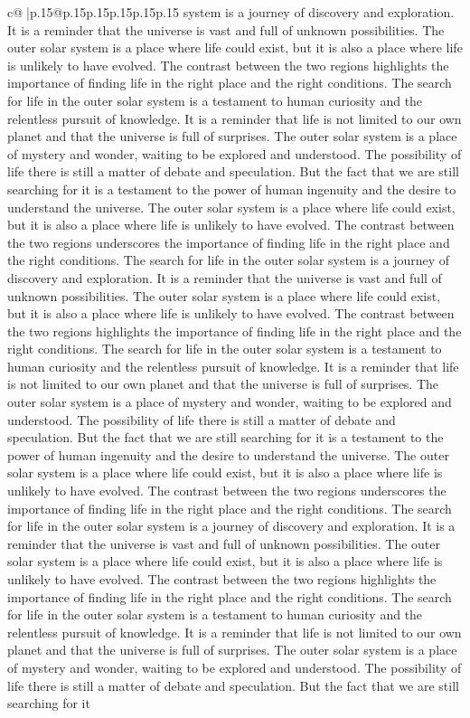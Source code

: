 \documentclass{article}
\begin{document}
{\begin{supertabular}{c@{$\;$}|p{.15\linewidth}@{}p{.15\linewidth}p{.15\linewidth}p{.15\linewidth}p{.15\linewidth}p{.15\linewidth}}
{{{system is a journey of discovery and exploration. It is a reminder that the universe is vast and full of unknown possibilities. The outer solar system is a place where life could exist, but it is also a place where life is unlikely to have evolved. The contrast between the two regions highlights the importance of finding life in the right place and the right conditions. The search for life in the outer solar system is a testament to human curiosity and the relentless pursuit of knowledge. It is a reminder that life is not limited to our own planet and that the universe is full of surprises. The outer solar system is a place of mystery and wonder, waiting to be explored and understood. The possibility of life there is still a matter of debate and speculation. But the fact that we are still searching for it is a testament to the power of human ingenuity and the desire to understand the universe. The outer solar system is a place where life could exist, but it is also a place where life is unlikely to have evolved. The contrast between the two regions underscores the importance of finding life in the right place and the right conditions. The search for life in the outer solar system is a journey of discovery and exploration. It is a reminder that the universe is vast and full of unknown possibilities. The outer solar system is a place where life could exist, but it is also a place where life is unlikely to have evolved. The contrast between the two regions highlights the importance of finding life in the right place and the right conditions. The search for life in the outer solar system is a testament to human curiosity and the relentless pursuit of knowledge. It is a reminder that life is not limited to our own planet and that the universe is full of surprises. The outer solar system is a place of mystery and wonder, waiting to be explored and understood. The possibility of life there is still a matter of debate and speculation. But the fact that we are still searching for it is a testament to the power of human ingenuity and the desire to understand the universe. The outer solar system is a place where life could exist, but it is also a place where life is unlikely to have evolved. The contrast between the two regions underscores the importance of finding life in the right place and the right conditions. The search for life in the outer solar system is a journey of discovery and exploration. It is a reminder that the universe is vast and full of unknown possibilities. The outer solar system is a place where life could exist, but it is also a place where life is unlikely to have evolved. The contrast between the two regions highlights the importance of finding life in the right place and the right conditions. The search for life in the outer solar system is a testament to human curiosity and the relentless pursuit of knowledge. It is a reminder that life is not limited to our own planet and that the universe is full of surprises. The outer solar system is a place of mystery and wonder, waiting to be explored and understood. The possibility of life there is still a matter of debate and speculation. But the fact that we are still searching for it }}}
\end{supertabular}}
\end{document}
